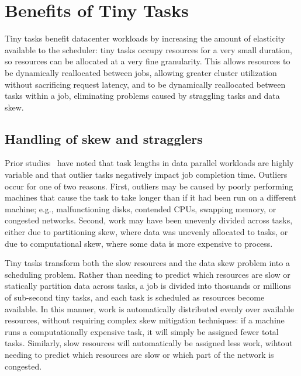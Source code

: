 \section{Benefits of Tiny Tasks}
\label{sec:benefits}


Tiny tasks benefit datacenter workloads by increasing the amount of elasticity
available to the scheduler: tiny tasks occupy resources for a very small
duration, so resources can be allocated at a very fine granularity. This
allows resources to be dynamically reallocated between jobs, allowing greater
cluster utilization without sacrificing request latency, and to be dynamically
reallocated between tasks within a job, eliminating problems caused
by straggling tasks and data skew.

\subsection{Handling of skew and stragglers}
Prior studies~\cite{ananthanarayanan2010reining,zaharia2008improving} have noted that
task lengths in data parallel workloads are highly variable and that outlier
tasks negatively impact job completion time.
Outliers occur for one of two reasons.
First, outliers may be caused by poorly performing machines that cause the
task to take longer than if it had been run on a different machine; e.g.,
malfunctioning disks, contended CPUs, swapping memory, or congested networks.
Second, work may have been unevenly
divided across tasks, either due to
partitioning skew, where data was unevenly allocated to tasks, or due to
computational skew, where some data is more expensive to process.

Tiny tasks transform both the slow resources and the data skew problem
into a scheduling problem.  Rather than needing to predict which resources
are slow or statically partition data across tasks, a job is divided into
thosuands or millions of sub-second tiny tasks, and each task is scheduled
as resources become available.  In this manner, work is automatically
distributed evenly over available resources, without requiring complex skew
mitigation techniques: if a machine runs a computationally expensive task, it
will simply be assigned fewer total tasks.  Similarly, slow resources will
automatically be assigned less work, wihtout needing to predict which
resources are slow or which part of the network is congested.


